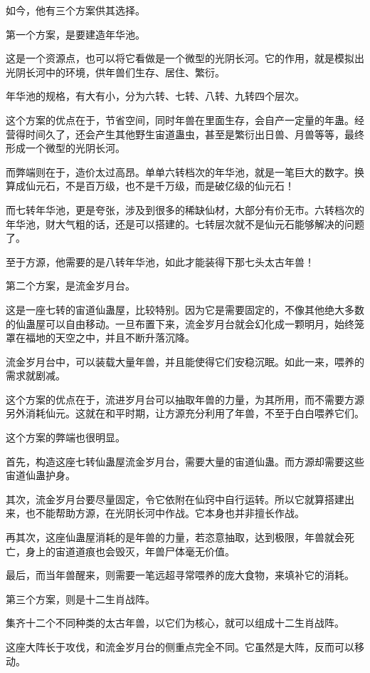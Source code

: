 \begin{this_body}
如今，他有三个方案供其选择。

第一个方案，是要建造年华池。

这是一个资源点，也可以将它看做是一个微型的光阴长河。它的作用，就是模拟出光阴长河中的环境，供年兽们生存、居住、繁衍。

年华池的规格，有大有小，分为六转、七转、八转、九转四个层次。

这个方案的优点在于，节省空间，同时年兽在里面生存，会自产一定量的年蛊。经营得时间久了，还会产生其他野生宙道蛊虫，甚至是繁衍出日兽、月兽等等，最终形成一个微型的光阴长河。

而弊端则在于，造价太过高昂。单单六转档次的年华池，就是一笔巨大的数字。换算成仙元石，不是百万级，也不是千万级，而是破亿级的仙元石！

而七转年华池，更是夸张，涉及到很多的稀缺仙材，大部分有价无市。六转档次的年华池，财大气粗的话，还是可以搭建的。七转层次就不是仙元石能够解决的问题了。

至于方源，他需要的是八转年华池，如此才能装得下那七头太古年兽！

第二个方案，是流金岁月台。

这是一座七转的宙道仙蛊屋，比较特别。因为它是需要固定的，不像其他绝大多数的仙蛊屋可以自由移动。一旦布置下来，流金岁月台就会幻化成一颗明月，始终笼罩在福地的天空之中，并且不断升落沉降。

流金岁月台中，可以装载大量年兽，并且能使得它们安稳沉眠。如此一来，喂养的需求就剧减。

这个方案的优点在于，流进岁月台可以抽取年兽的力量，为其所用，而不需要方源另外消耗仙元。这就在和平时期，让方源充分利用了年兽，不至于白白喂养它们。

这个方案的弊端也很明显。

首先，构造这座七转仙蛊屋流金岁月台，需要大量的宙道仙蛊。而方源却需要这些宙道仙蛊护身。

其次，流金岁月台要尽量固定，令它依附在仙窍中自行运转。所以它就算搭建出来，也不能帮助方源，在光阴长河中作战。它本身也并非擅长作战。

再其次，这座仙蛊屋消耗的是年兽的力量，若恣意抽取，达到极限，年兽就会死亡，身上的宙道道痕也会毁灭，年兽尸体毫无价值。

最后，而当年兽醒来，则需要一笔远超寻常喂养的庞大食物，来填补它的消耗。

第三个方案，则是十二生肖战阵。

集齐十二个不同种类的太古年兽，以它们为核心，就可以组成十二生肖战阵。

这座大阵长于攻伐，和流金岁月台的侧重点完全不同。它虽然是大阵，反而可以移动。


\end{this_body}
